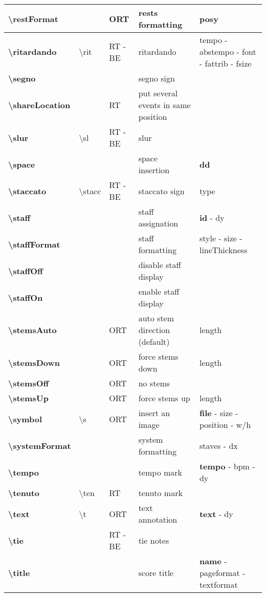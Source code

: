 \documentclass[a4paper, landscape, 10pt]{article}
\begin{document}
\begin{tabularx}{\linewidth}{p{3cm}p{4.5cm}p{3cm}p{5.5cm}l}
    \hline
    \textbf{\textbackslash{}restFormat}&&ORT&rests formatting&posy\\
    \hline
    \textbf{\textbackslash{}ritardando}&\textbackslash{}rit&RT - BE&ritardando&tempo - abstempo - font - fattrib - fsize\\
    \hline
    \textbf{\textbackslash{}segno}&&&segno sign&\\
    \hline
    \textbf{\textbackslash{}shareLocation}&&RT&put several events in same position&\\
    \hline
    \textbf{\textbackslash{}slur}&\textbackslash{}sl&RT - BE&slur&\\
    \hline
    \textbf{\textbackslash{}space}&&&space insertion&\textbf{dd}\\
    \hline
    \textbf{\textbackslash{}staccato}&\textbackslash{}stacc&RT - BE&staccato sign&type\\
    \hline
    \textbf{\textbackslash{}staff}&&&staff assignation&\textbf{id} - dy\\
    \hline
    \textbf{\textbackslash{}staffFormat}&&&staff formatting&style - size - lineThickness\\
    \hline
    \textbf{\textbackslash{}staffOff}&&&disable staff display&\\
    \hline
    \textbf{\textbackslash{}staffOn}&&&enable staff display&\\
    \hline
    \textbf{\textbackslash{}stemsAuto}&&ORT&auto stem direction (default)&length\\
    \hline
    \textbf{\textbackslash{}stemsDown}&&ORT&force stems down&length\\
	\hline
    \textbf{\textbackslash{}stemsOff}&&ORT&no stems&\\
    \hline
    \textbf{\textbackslash{}stemsUp}&&ORT&force stems up&length\\
    \hline
    \textbf{\textbackslash{}symbol}&\textbackslash{}s&ORT&insert an image&\textbf{file} - size - position - w/h\\
    \hline
    \textbf{\textbackslash{}systemFormat}&&&system formatting&staves - dx\\ %
    \hline
    \textbf{\textbackslash{}tempo}&&&tempo mark&\textbf{tempo} - bpm - dy\\
    \hline
    \textbf{\textbackslash{}tenuto}&\textbackslash{}ten&RT&tenuto mark&\\ %
    \hline
    \textbf{\textbackslash{}text}&\textbackslash{}t&ORT&text annotation&\textbf{text} - dy\\
    \hline
    \textbf{\textbackslash{}tie}&&RT - BE&tie notes&\\
    \hline
    \textbf{\textbackslash{}title}&&&score title&\textbf{name} - pageformat - textformat\\
    \hline
\end{tabularx}
\end{document}
